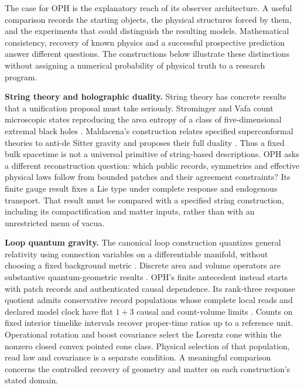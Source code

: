 The case for OPH is the explanatory reach of its observer architecture.
A useful comparison records the starting objects, the physical structures
forced by them, and the experiments that could distinguish the resulting
models. Mathematical consistency, recovery of known physics and a successful
prospective prediction answer different questions. The constructions below
illustrate these distinctions without assigning a numerical probability of
physical truth to a research program.

\textbf{String theory and holographic duality.}
String theory has concrete results that a unification proposal must take
seriously. Strominger and Vafa count microscopic states reproducing the
area entropy of a class of five-dimensional extremal black holes
\cite{comparisonStromingerVafa}. Maldacena's construction relates specified
superconformal theories to anti-de Sitter gravity and proposes their full
duality \cite{comparisonMaldacena}. Thus a fixed bulk spacetime is not a
universal primitive of string-based descriptions. OPH asks a different
reconstruction question: which public records, symmetries and effective
physical laws follow from bounded patches and their agreement constraints?
Its finite gauge result fixes a Lie type under complete response and
endogenous transport. That result must be compared with a specified string
construction, including its compactification and matter inputs, rather than
with an unrestricted menu of vacua.

\textbf{Loop quantum gravity.}
The canonical loop construction quantizes general relativity using
connection variables on a differentiable manifold, without choosing a fixed
background metric \cite{comparisonAshtekarLewandowski}. Discrete area and
volume operators are substantive quantum-geometric results
\cite{comparisonRovelliSmolin}. OPH's finite antecedent instead starts with
patch records and authenticated causal dependence. Its rank-three response
quotient admits conservative record populations whose complete local reads
and declared model clock have flat $1+3$ causal and count-volume limits
\cite{ophEinstein}. Counts on fixed interior timelike intervals recover proper-time
ratios up to a reference unit. Operational rotation and boost covariance
select the Lorentz cone within the nonzero closed convex pointed cone class.
Physical selection of that population, read law and covariance is a
separate condition. A meaningful comparison concerns the controlled recovery
of geometry and matter on each construction's stated domain.

